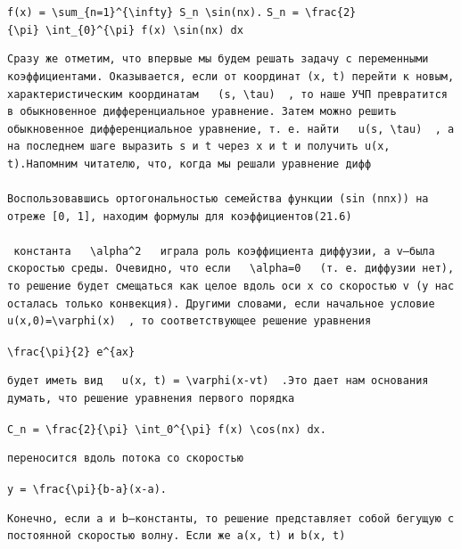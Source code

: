 \documentclass[
  ukrainian,
]{article}
\begin{document}
\texttt{f(x)\ =\ \textbackslash{}sum\_\{n=1\}\^{}\{\textbackslash{}infty\}\ S\_n\ \textbackslash{}sin(nx).}
\texttt{S\_n\ =\ \textbackslash{}frac\{2\}\{\textbackslash{}pi\}\ \textbackslash{}int\_\{0\}\^{}\{\textbackslash{}pi\}\ f(x)\ \textbackslash{}sin(nx)\ dx}

\begin{verbatim}
Сразу же отметим, что впервые мы будем решать задачу с переменными коэффициентами. Оказывается, если от координат (x, t) перейти к новым, характеристическим координатам   (s, \tau)  , то наше УЧП превратится в обыкновенное дифференциальное уравнение. Затем можно решить обыкновенное дифференциальное уравнение, т. е. найти   u(s, \tau)  , а на последнем шаге выразить s и t через x и t и получить u(x, t).Напомним читателю, что, когда мы решали уравнение дифф 

Воспользовавшись ортогональностью семейства функции (sin (nnx)) на отреже [0, 1], находим формулы для коэффициентов(21.6)

 константа   \alpha^2   играла роль коэффициента диффузии, а v—была скоростью среды. Очевидно, что если   \alpha=0   (т. е. диффузии нет), то решение будет смещаться как целое вдоль оси x со скоростью v (у нас осталась только конвекция). Другими словами, если начальное условие   u(x,0)=\varphi(x)  , то соответствующее решение уравнения
\end{verbatim}

\texttt{\textbackslash{}frac\{\textbackslash{}pi\}\{2\}\ e\^{}\{ax\}}

\begin{verbatim}
будет иметь вид   u(x, t) = \varphi(x-vt)  .Это дает нам основания думать, что решение уравнения первого порядка
\end{verbatim}

\texttt{C\_n\ =\ \textbackslash{}frac\{2\}\{\textbackslash{}pi\}\ \textbackslash{}int\_0\^{}\{\textbackslash{}pi\}\ f(x)\ \textbackslash{}cos(nx)\ dx.}

\begin{verbatim}
переносится вдоль потока со скоростью
\end{verbatim}

\texttt{y\ =\ \textbackslash{}frac\{\textbackslash{}pi\}\{b-a\}(x-a).}

\begin{verbatim}
Конечно, если a и b—константы, то решение представляет собой бегущую с постоянной скоростью волну. Если же a(x, t) и b(x, t)
\end{verbatim}
\end{document}
